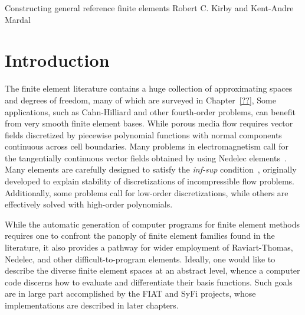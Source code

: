 \newtheorem{definition}{Definition}[section]
\newtheorem{proposition}{Proposition}[section]
\newtheorem{remark}{Remark}[section]

\newcommand{\mathbfx}[1]{{\mbox{\boldmath $#1$}}}
\renewcommand{\P}{{\mathbb P}}
\renewcommand{\H}{{\mathbb H}}
\newcommand{\xxi}{\mathbfx{\xi}}
\newcommand{\xxx}{\mathbf{x}}
\newcommand{\eee}{\mathbf{e}}
\newcommand{\GG}{\mathbf{G}}
\newcommand{\kentc}[1]{\marginpar{\tiny KAM: #1}}
\newcommand{\rckc}[1]{\marginpar{\tiny RCK: #1}}




              {Constructing general reference finite elements}
              {Robert C. Kirby and Kent-Andre Mardal}

%



\section{Introduction}
The finite element literature contains a huge collection of
approximating spaces and degrees of freedom, many of which are
surveyed in Chapter~\ref{??}, 
Some applications, such as Cahn-Hilliard and
other fourth-order problems, can benefit from very smooth finite
element bases.  While porous media flow requires
vector fields discretized by piecewise polynomial functions with
normal components continuous across cell boundaries.  Many problems in 
electromagnetism call for the tangentially continuous vector fields obtained
by using Nedelec elements~\cite{nedelec}.  Many elements are carefully designed
to satisfy the \emph{inf-sup} condition~\cite{BrezziFortin,g-r},
originally developed to explain stability of discretizations of 
incompressible flow problems.  Additionally, some problems call for low-order
discretizations, while others are effectively solved with high-order
polynomials. 

While the automatic generation of computer programs for finite element
methods requires one to confront the panoply of  finite
element families found in the literature, it also provides a pathway
for wider employment of Raviart-Thomas, Nedelec, and other
difficult-to-program elements.  
Ideally, one would like to
describe the diverse finite element spaces at an abstract level,
whence a computer code discerns how to evaluate and differentiate
their basis functions.  Such goals are in large part accomplished by
the FIAT and SyFi projects, whose implementations are described in
later chapters.  

